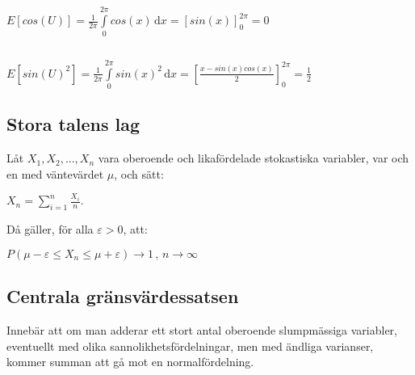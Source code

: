 \documentclass{article}
\begin{document}
\addtocounter{section}{1}

\subsection{}

$
E[cos(U)] =
\frac{1}{2\pi} \int \limits_0^{2\pi} cos(x) \, \mathrm{d}x =
\left[sin(x)\right]_0^{2\pi} =
0
$

\subsection{}

$
E[sin(U)^2] =
\frac{1}{2\pi} \int \limits_0^{2\pi} sin(x)^2 \, \mathrm{d}x =
\left[\frac{x-sin(x)cos(x)}{2}\right]_0^{2\pi} =
\frac{1}{2}
$

\addtocounter{section}{1}

\newpage

\subsection{Stora talens lag}

Låt $ X_1, X_2, ..., X_n $ vara oberoende och likafördelade stokastiska
variabler, var och en med väntevärdet $\mu$, och sätt:

$
X_n = \sum\limits_{i=1}^{n}\frac{X_i}{n}.
$

Då gäller, för alla $\varepsilon > 0$, att:

$
P(\mu - \varepsilon \le X_n \le \mu + \varepsilon) \to 1 \, , \, n \to \infty
$

\addtocounter{section}{1}

\subsection{Centrala gränsvärdessatsen}

Innebär att om man adderar ett stort antal oberoende slumpmässiga variabler,
eventuellt med olika sannolikhetsfördelningar, men med ändliga varianser, kommer
summan att gå mot en normalfördelning.
\end{document}
